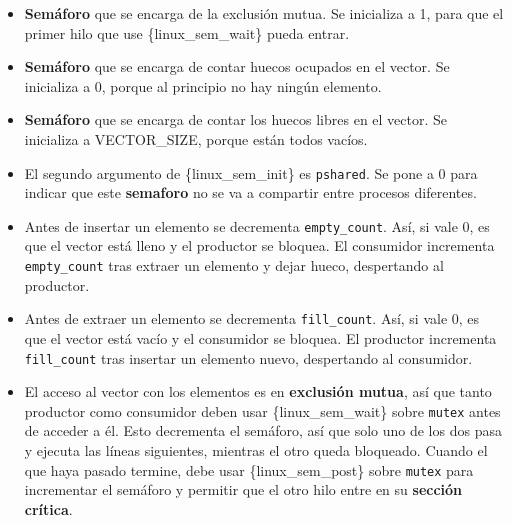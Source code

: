 \begin{Shaded}
\begin{Highlighting}[]
        \OperatorTok{=}\OperatorTok{();}
\OperatorTok{();}

\OperatorTok{(} \OperatorTok{\&}\OperatorTok{);}       
\OperatorTok{(} \OperatorTok{\&}\OperatorTok{);} 

\OperatorTok{(}\OperatorTok{);}
    \OperatorTok{\}}

\OperatorTok{\}}
\end{Highlighting}
\end{Shaded}

\begin{itemize}
\item
  \textbf{Semáforo} que se encarga de la exclusión mutua. Se inicializa
  a 1, para que el primer hilo que use \{linux\_sem\_wait\} pueda
  entrar.
\item
  \textbf{Semáforo} que se encarga de contar huecos ocupados en el
  vector. Se inicializa a 0, porque al principio no hay ningún elemento.
\item
  \textbf{Semáforo} que se encarga de contar los huecos libres en el
  vector. Se inicializa a VECTOR\_SIZE, porque están todos vacíos.
\item
  El segundo argumento de \{linux\_sem\_init\} es \texttt{pshared}. Se
  pone a 0 para indicar que este \textbf{semaforo} no se va a compartir
  entre procesos diferentes.
\item
  Antes de insertar un elemento se decrementa \texttt{empty\_count}.
  Así, si vale 0, es que el vector está lleno y el productor se bloquea.
  El consumidor incrementa \texttt{empty\_count} tras extraer un
  elemento y dejar hueco, despertando al productor.
\item
  Antes de extraer un elemento se decrementa \texttt{fill\_count}. Así,
  si vale 0, es que el vector está vacío y el consumidor se bloquea. El
  productor incrementa \texttt{fill\_count} tras insertar un elemento
  nuevo, despertando al consumidor.
\item
  El acceso al vector con los elementos es en \textbf{exclusión mutua},
  así que tanto productor como consumidor deben usar
  \{linux\_sem\_wait\} sobre \texttt{mutex} antes de acceder a él. Esto
  decrementa el semáforo, así que solo uno de los dos pasa y ejecuta las
  líneas siguientes, mientras el otro queda bloqueado. Cuando el que
  haya pasado termine, debe usar \{linux\_sem\_post\} sobre
  \texttt{mutex} para incrementar el semáforo y permitir que el otro
  hilo entre en su \textbf{sección crítica}.
\end{itemize}

